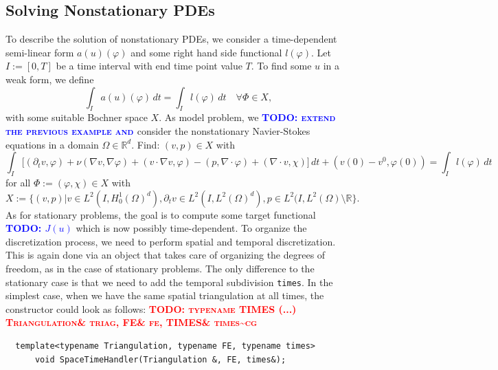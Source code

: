 \documentclass[prodmode,acmtoms]{acmsmall}
\numberwithin{equation}{section}
\renewcommand{\phi}{\varphi}
\newcommand{\todo}[1]{\textbf{\textsc{\textcolor{blue}{TODO: #1}}}}
\newcommand{\todocg}[1]{\textbf{\textsc{\textcolor{red}{TODO: #1\textasciitilde cg}}}}
\begin{document}
\subsection{Solving Nonstationary PDEs}\label{sec:timedep}
To describe the solution of nonstationary 
PDEs, we consider a time-dependent semi-linear form $a(u)(\phi)$ and some
right hand side functional $l(\phi)$.
Let $I:=[0,T]$ be a time interval with end time point value $T$.
To find some $u$ in a weak form, we define
\[
\int_I a(u)(\phi)\, dt = \int_I l(\phi)\, dt \quad \forall\Phi\in X,
\]
with some suitable Bochner space $X$.  As model problem,
we 
\todo{extend the previous example and }consider the nonstationary Navier-Stokes equations
in a domain $\Omega\in\mathbb{R}^d$. Find: 
$(v,p)\in X$ with
\[
\int_I \bigl[ (\partial_t v, \phi)
+ \nu (\nabla v, \nabla \phi) + (v\cdot\nabla v, \phi)
- (p,\nabla\cdot \phi)
+ (\nabla\cdot v, \chi)\bigr] \, dt
+ (v(0) - v^0, \phi(0))
= \int_I l(\phi) \, dt 
\]
for all $\Phi:= (\phi, \chi) \in X$ with
\[
X:= \bigl\{ 
(v,p) | v\in L^2(I,H_0^1(\Omega)^d) , 
\partial_t v\in L^2(I, L^2(\Omega)^d), 
p\in L^2(I,L^2(\Omega)\setminus\mathbb{R} \bigr\}.
\]
As for stationary problems, the goal is to compute
some target functional \todo{$J(u)$} which is now possibly 
time-dependent. To organize the discretization 
process, we need to perform spatial and temporal 
discretization. This is again done via
an object that takes care of organizing the degrees of 
freedom, as in the case of stationary problems.
The only difference to the stationary case is that we need to 
add the temporal subdivision \texttt{times}. In the simplest 
case, when we have the same spatial triangulation 
at all times, the constructor could look as follows:
\todocg{typename TIMES (...) Triangulation\& triag, FE\& fe, TIMES\& times}
\begin{lstlisting}
  template<typename Triangulation, typename FE, typename times>
      void SpaceTimeHandler(Triangulation &, FE, times&);
\end{lstlisting}
\end{document}

